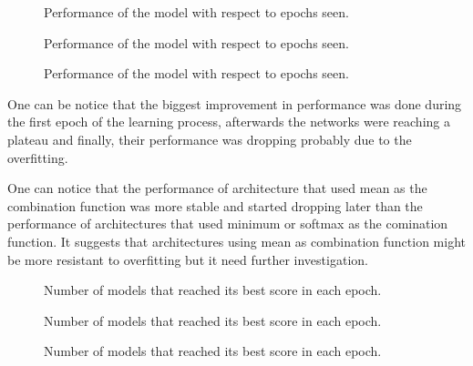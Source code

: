 \documentclass[a4paper,10pt]{report}
\begin{document}
    \begin{figure}[!htb]\centering
      \begin {minipage}{\textwidth}
	\caption{Performance of the model with respect to epochs seen.}\label{Fig:MEAN_LEARNING}
      \end{minipage}
      
      \begin{minipage}{0.49\textwidth}
	\caption{Performance of the model with respect to epochs seen.}\label{Fig:MIN_LEARNING}
      \end{minipage}
      \begin {minipage}{0.49\textwidth}
	\caption{Performance of the model with respect to epochs seen.}\label{Fig:SOFT_LEARNING}
      \end{minipage}
    \end{figure}
    
    One can be notice that the biggest improvement in performance was done during the first epoch of the learning process, afterwards the networks were reaching a plateau and finally, their performance was dropping probably due to the overfitting.

    One can notice that the performance of architecture that used mean as the combination function was more stable and started dropping later than the performance of architectures that used minimum or softmax as the comination function. It suggests that architectures using mean as combination function might be more resistant to overfitting but it need further investigation.

    \begin{figure}[!htb]\centering
      \begin{minipage}{0.9\textwidth}
	\caption{Number of models that reached its best score in each epoch.}\label{Fig:SOFT_MAX}
      \end{minipage}
      
      \begin {minipage}{0.49\textwidth}
	\caption{Number of models that reached its best score in each epoch.}\label{Fig:MIN_MAX}
      \end{minipage}
      \begin {minipage}{0.49\textwidth}
	\caption{Number of models that reached its best score in each epoch.}\label{Fig:MEAN_MAX}
      \end{minipage}
    \end{figure}
    
\end{document}
